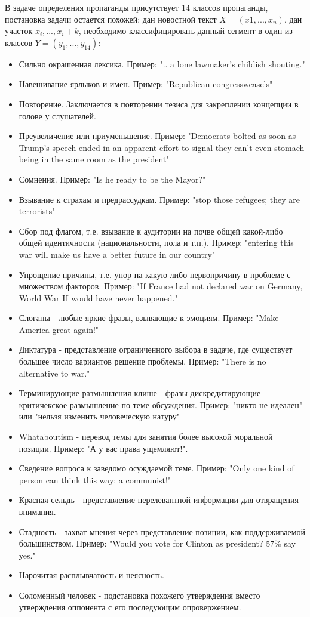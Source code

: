 В задаче определения пропаганды присутствует 14 классов пропаганды, постановка задачи остается похожей: дан новостной текст $X = (x1, ..., x_n)$, дан участок $x_i, ..., x_i + k$, необходимо классифицировать данный сегмент в один из классов $Y = (y_1, ..., y_14)$:
\begin{itemize}
    \item Сильно окрашенная лексика. Пример: ".. a lone lawmaker’s childish shouting."
    \item Навешивание ярлыков и имен. Пример: "Republican congressweasels"
    \item Повторение. Заключается в повторении тезиса для закреплении концепции в голове у слушателей.
    \item Преувеличение или приуменьшение. Пример: "Democrats bolted as soon as Trump’s speech ended in an apparent effort to signal they can’t even stomach being in the same room as the president"
    \item Сомнения. Пример: "Is he ready to be the Mayor?"
    \item Взывание к страхам и предрассудкам. Пример: "stop those refugees; they are terrorists"
    \item Сбор под флагом, т.е. взывание к аудитории на почве общей какой-либо общей идентичности (национальности, пола и т.п.). Пример: "entering this war will make us have a better future in our country"
    \item Упрощение причины, т.е. упор на какую-либо первопричину в проблеме с множеством факторов. Пример: "If France had not declared war on Germany, World War II would have never happened."
    \item Слоганы - любые яркие фразы, взывающие к эмоциям. Пример: "Make America great again!"
    \item Диктатура - представление ограниченного выбора в задаче, где существует большее число вариантов решение проблемы. Пример: "There is no alternative to war."
    \item Терминирующие размышления клише - фразы дискредитирующие критичекское размышление по теме обсуждения. Пример: "никто не идеален" или "нельзя изменить человеческую натуру"
    \item Whataboutism - перевод темы для занятия более высокой моральной позиции. Пример: "А у вас права ущемляют!".
    \item Сведение вопроса к заведомо осуждаемой теме. Пример: "Only one kind of person can think this way: a communist!"
    \item Красная сельдь - представление нерелевантной информации для отвращения внимания. 
    \item Стадность - захват мнения через представление позиции, как поддерживаемой большинством. Пример: "Would you vote for Clinton as president? 57\% say yes."
    \item Нарочитая расплывчатость и неясность.
    \item Соломенный человек - подстановка похожего утверждения вместо утверждения оппонента с его последующим опровержением.
\end{itemize}

